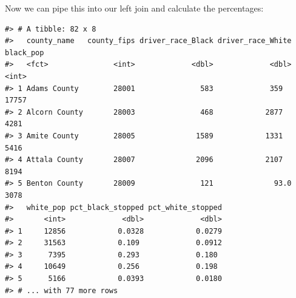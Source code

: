 \documentclass[]{book}
\newenvironment{Shaded}{\begin{snugshade}}{\end{snugshade}}
\newcommand{\KeywordTok}[1]{\textcolor[rgb]{0.13,0.29,0.53}{\textbf{#1}}}
\newcommand{\DataTypeTok}[1]{\textcolor[rgb]{0.13,0.29,0.53}{#1}}
\newcommand{\DecValTok}[1]{\textcolor[rgb]{0.00,0.00,0.81}{#1}}
\newcommand{\StringTok}[1]{\textcolor[rgb]{0.31,0.60,0.02}{#1}}
\newcommand{\CommentTok}[1]{\textcolor[rgb]{0.56,0.35,0.01}{\textit{#1}}}
\newcommand{\OtherTok}[1]{\textcolor[rgb]{0.56,0.35,0.01}{#1}}
\newcommand{\OperatorTok}[1]{\textcolor[rgb]{0.81,0.36,0.00}{\textbf{#1}}}
\newcommand{\NormalTok}[1]{#1}
\theoremstyle{definition}
\theoremstyle{definition}
\theoremstyle{definition}
\theoremstyle{remark}
\begin{document}
Now we can pipe this into our left join and calculate the percentages:

\begin{Shaded}
\end{Shaded}

\begin{verbatim}
#> # A tibble: 82 x 8
#>   county_name   county_fips driver_race_Black driver_race_White black_pop
#>   <fct>               <int>             <dbl>             <dbl>     <int>
#> 1 Adams County        28001               583             359       17757
#> 2 Alcorn County       28003               468            2877        4281
#> 3 Amite County        28005              1589            1331        5416
#> 4 Attala County       28007              2096            2107        8194
#> 5 Benton County       28009               121              93.0      3078
#>   white_pop pct_black_stopped pct_white_stopped
#>       <int>             <dbl>             <dbl>
#> 1     12856            0.0328            0.0279
#> 2     31563            0.109             0.0912
#> 3      7395            0.293             0.180 
#> 4     10649            0.256             0.198 
#> 5      5166            0.0393            0.0180
#> # ... with 77 more rows
\end{verbatim}
\end{document}
